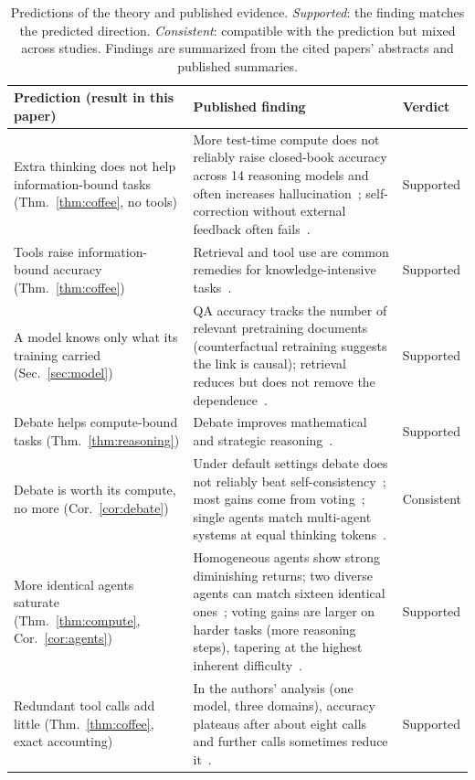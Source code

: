 \documentclass[conference]{IEEEtran}
\theoremstyle{definition}
\begin{document}
\begin{table}[t]
\caption{Predictions of the theory and published evidence. \emph{Supported}:
the finding matches the predicted direction. \emph{Consistent}: compatible with
the prediction but mixed across studies. Findings are summarized from the cited
papers' abstracts and published summaries.}
\label{tab:evidence}
\centering
\footnotesize
\begin{tabular}{@{}p{4.4cm}p{9.6cm}p{2.0cm}@{}}
\toprule
Prediction (result in this paper) & Published finding & Verdict \\
\midrule
Extra thinking does not help information-bound tasks (Thm.~\ref{thm:coffee}, no tools)
 & More test-time compute does not reliably raise closed-book accuracy across 14 reasoning models and often increases hallucination~\cite{zhao2026}; self-correction without external feedback often fails~\cite{huang2024}. & Supported \\
Tools raise information-bound accuracy (Thm.~\ref{thm:coffee})
 & Retrieval and tool use are common remedies for knowledge-intensive tasks~\cite{lewis2020,yao2023,schick2023}. & Supported \\
A model knows only what its training carried (Sec.~\ref{sec:model})
 & QA accuracy tracks the number of relevant pretraining documents (counterfactual retraining suggests the link is causal); retrieval reduces but does not remove the dependence~\cite{kandpal2023}. & Supported \\
Debate helps compute-bound tasks (Thm.~\ref{thm:reasoning})
 & Debate improves mathematical and strategic reasoning~\cite{du2024}. & Supported \\
Debate is worth its compute, no more (Cor.~\ref{cor:debate})
 & Under default settings debate does not reliably beat self-consistency~\cite{smit2024}; most gains come from voting~\cite{choi2025}; single agents match multi-agent systems at equal thinking tokens~\cite{tran2026}. & Consistent \\
More identical agents saturate (Thm.~\ref{thm:compute}, Cor.~\ref{cor:agents})
 & Homogeneous agents show strong diminishing returns; two diverse agents can match sixteen identical ones~\cite{yang2026}; voting gains are larger on harder tasks (more reasoning steps), tapering at the highest inherent difficulty~\cite{li2024agents}. & Supported \\
Redundant tool calls add little (Thm.~\ref{thm:coffee}, exact accounting)
 & In the authors' analysis (one model, three domains), accuracy plateaus after about eight calls and further calls sometimes reduce it~\cite{du2025infomosaic}. & Supported \\

\end{tabular}
\end{table}
\end{document}
